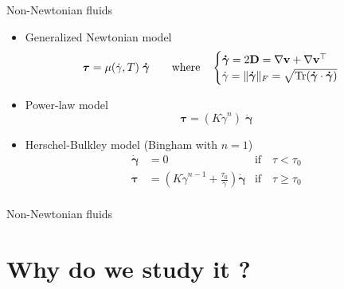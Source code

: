 \documentclass{beamer}  %
\newcommand{\vv}{\mathbf{v}}
\newcommand{\gam}{\boldsymbol{\dot \gamma}}
\begin{document}
\begin{frame}{Non-Newtonian fluids}
    \begin{itemize}
        \item Generalized Newtonian model
        \begin{equation*}
            \boldsymbol{\tau} = \mu(\dot \gamma, T) \;\boldsymbol{\dot \gamma} \qquad \text{where} \quad
            \begin{cases}
                \gam = 2 \mathbf{D} = \nabla \vv + \nabla \vv^\top\\
                \dot \gamma = \|\boldsymbol{\dot \gamma}\|_F = \sqrt{\Tr(\boldsymbol{\dot \gamma} \cdot \boldsymbol{\dot \gamma})}
            \end{cases}
        \end{equation*}
        \pause
        \item Power-law model
        \begin{equation*}
            \boldsymbol\tau = (K \dot \gamma^n) \; \gam
        \end{equation*}
        \pause
        \item Herschel-Bulkley model (Bingham with $n=1$)
        \begin{align*}
            \gam &= 0 & \text{if} \quad \tau < \tau_0\\
            \boldsymbol\tau &= \left(K \dot \gamma^{n-1} + \frac{\tau_0}{\dot \gamma}\right) \gam & \text{if} \quad \tau \geq \tau_0\\
        \end{align*}
    \end{itemize}    
\end{frame}

\begin{frame}{Non-Newtonian fluids}
    \begin{figure}
        \centering
        
    \end{figure}
\end{frame}


\section{Why do we study it ?}
\end{document}
